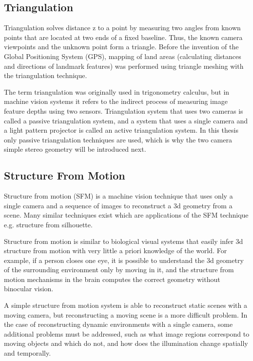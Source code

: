 \documentclass[12pt,a4paper,oneside,pdftex]{report}
\begin{document}
\subsection{Triangulation}
\label{subsection:triangulation}

Triangulation solves distance z to a point by measuring two angles from known points that are located at two ends of a fixed baseline. Thus, the known camera viewpoints and the unknown point form a triangle. Before the invention of the Global Positioning System (GPS), mapping of land areas (calculating distances and directions of landmark features) was performed using triangle meshing with the triangulation technique.

The term triangulation was originally used in trigonometry calculus, but in machine vision systems it refers to the indirect process of measuring image feature depths using two sensors. Triangulation system that uses two cameras is called a passive triangulation system, and a system that uses a single camera and a light pattern projector is called an active triangulation system. In this thesis only passive triangulation techniques are used, which is why the two camera simple stereo geometry will be introduced next.

\subsection{Structure From Motion}
\label{subsection:structure_from_motion}

Structure from motion (SFM) is a machine vision technique that uses only a single camera and a sequence of images to  reconstruct a 3d geometry from a scene. Many similar techniques exist which are applications of the SFM technique e.g. structure from silhouette.

Structure from motion is similar to biological visual systems that easily infer 3d structure from motion with very little a priori knowledge of the world. For example, if a person closes one eye, it is possible to understand the 3d geometry of the surrounding environment only by moving in it, and the structure from motion mechanisms in the brain computes the correct geometry without binocular vision.

A simple structure from motion system is able to reconstruct static scenes with a moving camera, but reconstructing a moving scene is a more difficult problem. In the case of reconstructing dynamic environments with a single camera, some additional problems must be addressed, such as what image regions correspond to moving objects and which do not, and how does the illumination change spatially and temporally.
\end{document}
